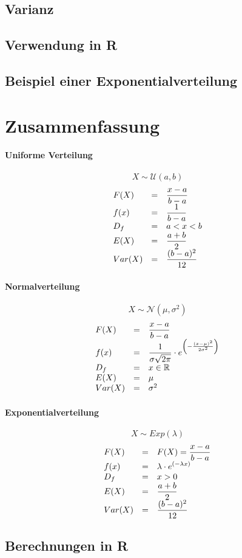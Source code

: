 \subsection{Varianz}
\subsection{Verwendung in R}
\subsection{Beispiel einer Exponentialverteilung}

\newpage
\section{Zusammenfassung}
\paragraph{Uniforme Verteilung}
\[ X \sim \mathcal{U}(a,b) \]
\[ \begin{array}{l c l}
	F(X) 
		& =
		& \displaystyle \frac{x-a}{b-a} \\
	f(x)	
		& =
		& \displaystyle \frac{1}{b-a}  \\
	D_f	
		& = 
		& a < x < b \\
	E(X)
		& = 
		& \displaystyle \frac{a+b}{2}\\
	Var(X)	
		& =
		& \displaystyle \frac{(b-a)^2}{12}\\
\end{array} \]

\paragraph{Normalverteilung}
\[ X \sim \mathcal{N}(\mu, \sigma^2) \]
\[ \begin{array}{l c l}
	F(X) 
		& =
		& \displaystyle \frac{x-a}{b-a} \\
	f(x)	
		& =
		& \displaystyle \frac{1}{\sigma\sqrt{2\pi}} \cdot
				e^{\left(
					-\frac{(x-\mu)^2}{2\sigma^2}
				\right)} \\
	D_f	
		& = 
		& x \in \mathbb{R} \\
	E(X)
		& = 
		& \mu\\
	Var(X)	
		& =
		& \sigma^2 \\
\end{array} \]

\paragraph{Exponentialverteilung}
\[ X \sim Exp(\lambda) \]
\[ \begin{array}{l c l}
	F(X) 
		& =
		& F(X) = \displaystyle \frac{x-a}{b-a} \\
	f(x)	
		& =
		& \displaystyle \lambda \cdot 
				e^{\left(
					-\lambda x
				\right)} \\
	D_f	
		& = 
		& x > 0 \\
	E(X)
		& = 
		& \displaystyle \frac{a+b}{2}\\
	Var(X)	
		& =
		& \displaystyle \frac{(b-a)^2}{12}\\
\end{array} \]


\subsection{Berechnungen in R}
